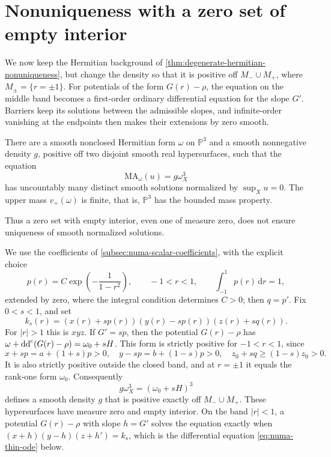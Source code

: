 \section{Nonuniqueness with a zero set of empty interior}
\label{sec:numa-thin-zero-set}

We now keep the Hermitian background of \cref{thm:degenerate-hermitian-nonuniqueness}, but change the density so that it is positive off $M_-\cup M_+$, where $M_\pm=\{r=\pm1\}$. For potentials of the form $G(r)-\rho$, the equation on the middle band becomes a first-order ordinary differential equation for the slope $G'$. Barriers keep its solutions between the admissible slopes, and infinite-order vanishing at the endpoints then makes their extensions by zero smooth.

\begin{theorem}\label{thm:numa-thin-zero-set}
There are a smooth nonclosed Hermitian form $\omega$ on $\mathbb P^3$ and a smooth nonnegative density $g$, positive off two disjoint smooth real hypersurfaces, such that the equation
\[
 \mathrm{MA}_\omega(u)=g\omega_X^3
\]
has uncountably many distinct smooth solutions normalized by $\sup_Xu=0$. The upper mass $v_+(\omega)$ is finite, that is, $\mathbb P^3$ has the bounded mass property.
\end{theorem}

Thus a zero set with empty interior, even one of measure zero, does not ensure uniqueness of smooth normalized solutions.

We use the coefficients of \cref{subsec:numa-scalar-coefficients}, with the explicit choice
\[
 p(r)=C\exp\!\left(-\frac1{1-r^2}\right),\qquad -1<r<1,
 \qquad \int_{-1}^1p(r)\,\mathrm{d}r=1,
\]
extended by zero, where the integral condition determines $C>0$; then $q=p'$. Fix $0<s<1$, and set
\[
 k_s(r)=(x(r)+sp(r))(y(r)-sp(r))(z(r)+sq(r)).
\]
For $|r|>1$ this is $xyz$. If $G'=sp$, then the potential $G(r)-\rho$ has $\omega+\mathrm{dd}^{\mathrm{c}}(G(r)-\rho)=\omega_0+sH$. This form is strictly positive for $-1<r<1$, since
\[
 x+sp=a+(1+s)p>0,\quad
 y-sp=b+(1-s)p>0,\quad
 z_0+sq\geq(1-s)z_0>0.
\]
It is also strictly positive outside the closed band, and at $r=\pm1$ it equals the rank-one form $\omega_0$. Consequently
\begin{equation}\label{eq:numa-thin-density}
 g\omega_X^3=(\omega_0+sH)^3
\end{equation}
defines a smooth density $g$ that is positive exactly off $M_-\cup M_+$. These hypersurfaces have measure zero and empty interior. On the band $|r|<1$, a potential $G(r)-\rho$ with slope $h=G'$ solves the equation exactly when $(x+h)(y-h)(z+h')=k_s$, which is the differential equation \eqref{eq:numa-thin-ode} below.

